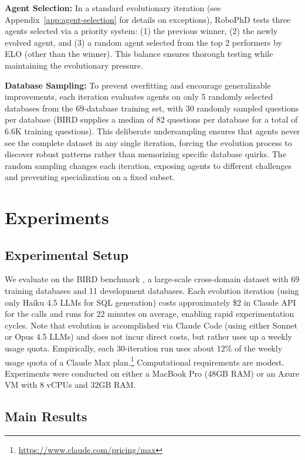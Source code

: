 \documentclass{article}
\begin{document}
\textbf{Agent Selection:} In a standard evolutionary iteration (see Appendix~\ref{app:agent-selection} for details on exceptions), RoboPhD tests three agents selected via a priority system: (1) the previous winner, (2) the newly evolved agent, and (3) a random agent selected from the top 2 performers by ELO (other than the winner). This balance ensures thorough testing while maintaining the evolutionary pressure.

\textbf{Database Sampling:} To prevent overfitting and encourage generalizable improvements, each iteration evaluates agents on only 5 randomly selected databases from the 69-database training set, with 30 randomly sampled questions per database (BIRD supplies a median of 82 questions per database for a total of 6.6K training questions). This deliberate undersampling ensures that agents never see the complete dataset in any single iteration, forcing the evolution process to discover robust patterns rather than memorizing specific database quirks. The random sampling changes each iteration, exposing agents to different challenges and preventing specialization on a fixed subset. 

\section{Experiments}

\subsection{Experimental Setup}

We evaluate on the BIRD benchmark \citep{bird2023}, a large-scale cross-domain dataset with 69 training databases and 11 development databases. Each evolution iteration (using only Haiku 4.5 LLMs for SQL generation) costs approximately \$2 in Claude API for the calls and runs for 22 minutes on average, enabling rapid experimentation cycles.  Note that evolution is accomplished via Claude Code (using either Sonnet or Opus 4.5 LLMs) and does not incur direct costs, but rather uses up a weekly usage quota.  Empirically, each 30-iteration run uses about 12\% of the weekly usage quota of a Claude Max plan.\footnote{\url{https://www.claude.com/pricing/max}}  Computational requirements are modest.  Experiments were conducted on either a MacBook Pro (48GB RAM) or an Azure VM with 8 vCPUs and 32GB RAM.

\subsection{Main Results}
\end{document}
